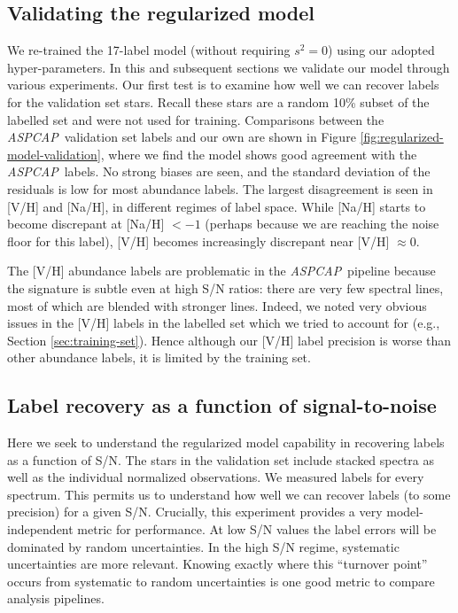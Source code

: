 \documentclass[12pt,preprint]{aastex}
\newcommand{\project}[1]{\textsl{#1}}
\newcommand{\acronym}[1]{{\small{#1}}}
\newcommand{\aspcap}{\project{\acronym{ASPCAP}}}
\begin{document}
\subsection{Validating the regularized model}
\label{sec:model-validation}


We re-trained the 17-label model (without requiring $s^2 = 0$) using our adopted
hyper-parameters.  In this and subsequent sections we validate our model through
various experiments.  Our first test is to examine how well we can recover
labels for the validation set stars.  Recall these stars are a random 10\%
subset of the labelled set and were not used for training.  Comparisons between
the \aspcap\ validation set labels and our own are shown in Figure
\ref{fig:regularized-model-validation}, where we find the model shows good
agreement with the \aspcap\ labels.  No strong biases are seen, and the standard
deviation of the residuals is low for most abundance labels.  The largest
disagreement is seen in [V/H] and [Na/H], in different regimes of label space.
While [Na/H] starts to become discrepant at [Na/H] $< -1$ (perhaps because we
are reaching the noise floor for this label), [V/H] becomes increasingly discrepant
near [V/H] $\approx 0$. 


The [V/H] abundance labels are problematic in the \aspcap\ pipeline 
because the signature is subtle even at high S/N ratios: there are very few
spectral lines, most of which are blended with stronger lines.  Indeed, we noted
very obvious issues in the [V/H] labels in the labelled set which we tried to
account for (e.g., Section \ref{sec:training-set}).  Hence although our [V/H]
label precision is worse than other abundance labels, it is limited by the
training set.


\subsection{Label recovery as a function of signal-to-noise}
\label{sec:label-recovery-snr}


Here we seek to understand the
regularized model capability in recovering labels as a function of S/N.  The 
stars in the validation set include stacked spectra as well as the individual 
normalized observations.  We measured labels for every spectrum.  This permits us
to understand how well we can recover labels (to some precision) for a given 
S/N.  Crucially, this experiment provides a very model-independent metric for
performance.  At low S/N values the label errors will be dominated by random
uncertainties.  In the high S/N regime, systematic uncertainties are more 
relevant.  Knowing exactly where this ``turnover point'' occurs from systematic
to random uncertainties is one good metric to compare analysis pipelines.
\end{document}

